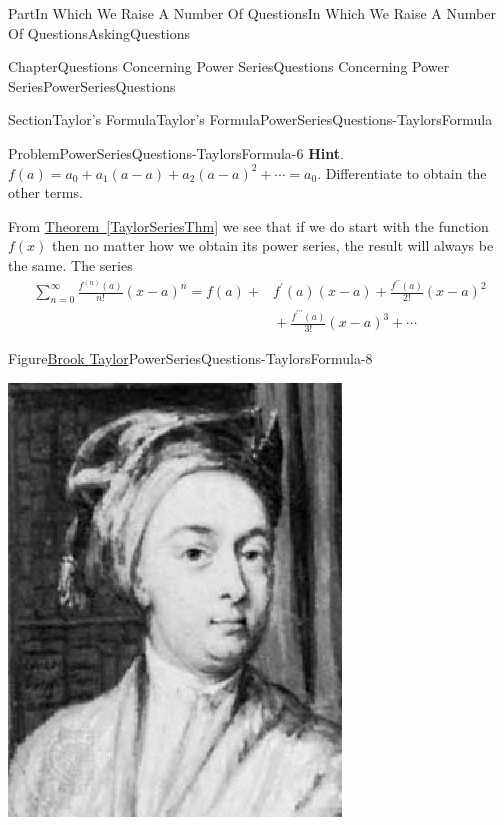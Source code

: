\documentclass[oneside,10pt,]{book}
\newcommand{\blocktitlefont}{\relax}
\newcommand{\xreffont}{\relax}
\numberwithin{equation}{part}
\newcommand{\amp}{&}
\begin{document}
\begin{partptx}{Part}{In Which We Raise A Number Of Questions}{}{In Which We Raise A Number Of Questions}{}{}{AskingQuestions}
\begin{chapterptx}{Chapter}{Questions Concerning Power Series}{}{Questions Concerning Power Series}{}{}{PowerSeriesQuestions}
\begin{sectionptx}{Section}{Taylor's Formula}{}{Taylor's Formula}{}{}{PowerSeriesQuestions-TaylorsFormula}
\begin{problem}{Problem}{}{PowerSeriesQuestions-TaylorsFormula-6}
\noindent\textbf{\blocktitlefont Hint}.\hypertarget{PowerSeriesQuestions-TaylorsFormula-6-2}{}\quad{}\(f(a)=a_0+a_1(a-a)+a_2(a-a)^2+\cdots=a_0\). Differentiate to obtain the other terms.%
\end{problem}
From \hyperref[TaylorSeriesThm]{Theorem~{\xreffont\ref{TaylorSeriesThm}}} we see that if we do start with the function \(f(x)\) then no matter how we obtain its power series, the result will always be the same. The series%
\begin{align*}
\sum_{n=0}^\infty\frac{f^{(n)}(a)}{n!}(x-a)^n=f(a)+\amp{}f^\prime(a)(x-a)+\frac{f^{\prime\prime}(a)}{2!}(x-a)^2\\
\amp{}+\frac{f^{\prime\prime\prime}(a)}{3!}(x-a)^3+\cdots
\end{align*}
%
\begin{figureptx}{Figure}{\href{https://mathshistory.st-andrews.ac.uk/Biographies/Taylor/}{Brook Taylor}\protect\footnotemark{}}{PowerSeriesQuestions-TaylorsFormula-8}{}%
%
\begin{image}{0.325}{0.35}{0.325}{}%
\includegraphics[width=\linewidth]{external/images/Taylor.png}

\end{image}
\end{figureptx}
\end{sectionptx}
\end{chapterptx}
\end{partptx}
\end{document}
